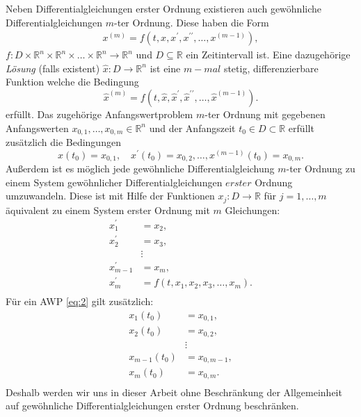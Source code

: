 \begin{bem}
    Neben Differentialgleichungen erster Ordnung existieren auch gewöhnliche Differentialgleichungen $m$-ter Ordnung.
    Diese haben die Form
    \begin{align}
        x^{(m)} = f(t, x, x^{\prime}, x^{\prime\prime}, \dots, x^{(m-1)}),
    \end{align}
    $
    f : D \times \mathbb{R}^{n} \times \mathbb{R}^{n} \times \dots \times \mathbb{R}^{n} \rightarrow \mathbb{R}^{n}
    $
    und $D \subseteq \mathbb{R}$ ein Zeitintervall ist. Eine dazugehörige \textit{Lösung} (falls existent)
    $\hat{x} : D \rightarrow \mathbb{R}^n$ ist eine $m-mal$ stetig, differenzierbare Funktion welche die Bedingung
    \[
        \hat{x}^{(m)} = f(t, \hat{x},\hat{x}^{\prime},\hat{x}^{\prime\prime}, \dots,\hat{x}^{(m-1)}).
    \]
    erfüllt. Das zugehörige Anfangswertproblem $m$-ter Ordnung mit gegebenen Anfangswerten
    $x_{0,1},\dots,x_{0,m} \in \mathbb{R}^{n}$ und der Anfangszeit $t_0 \in D \subset \mathbb{R}$ erfüllt zusätzlich die
    Bedingungen \[
        x(t_{0})=x_{0,1},\quad x^{\prime}(t_{0})=x_{0,2},\dots,x^{(m-1)}(t_{0})=x_{0,m}.
    \]
    Außerdem ist es möglich jede gewöhnliche Differentialgleichung $m$-ter Ordnung zu einem System gewöhnlicher
    Differentialgleichungen $erster$ Ordnung umzuwandeln. Diese ist mit Hilfe der Funktionen
    $x_{j}:D \rightarrow \mathbb{R}$ für $j = 1,\dots,m$ äquivalent zu einem System erster Ordnung mit $m$ Gleichungen:
    \begin{align}
        x_{1}^{\prime}&=x_{2}, \nonumber \\
        x_{2}^{\prime}&=x_{3}, \nonumber \\
        &\vdots\\
        x_{m-1}^{\prime}&=x_{m}, \nonumber \\
        x_{m}^{\prime}&=f(t, x_{1}, x_{2}, x_{3}, \ldots, x_{m}). \nonumber \\ \nonumber
    \end{align}
    Für ein AWP \eqref{eq:2} gilt zusätzlich:
    \begin{align}
        x_{1}(t_{0})&=x_{0,1}, \nonumber \\
        x_{2}(t_{0})&=x_{0,2}, \nonumber \\
        &\vdots \\
        x_{m-1}(t_{0})&=x_{0,m-1}, \nonumber \\
        x_{m}(t_{0})&=x_{0,m}. \nonumber \\ \nonumber
    \end{align}
    Deshalb werden wir uns in dieser Arbeit ohne Beschränkung der Allgemeinheit auf gewöhnliche Differentialgleichungen
    erster Ordnung beschränken.
\end{bem}
